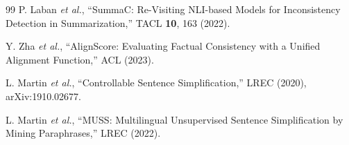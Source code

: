 \documentclass[aps,prb,reprint,nofootinbib,a4paper]{revtex4-2}
\begin{document}
\begin{thebibliography}{99}
 P. Laban \textit{et al.},
``SummaC: Re-Visiting NLI-based Models for Inconsistency Detection in
Summarization,'' TACL \textbf{10}, 163 (2022).

 Y. Zha \textit{et al.},
``AlignScore: Evaluating Factual Consistency with a Unified Alignment Function,''
ACL (2023).

 L. Martin \textit{et al.},
``Controllable Sentence Simplification,'' LREC (2020), arXiv:1910.02677.

 L. Martin \textit{et al.},
``MUSS: Multilingual Unsupervised Sentence Simplification by Mining
Paraphrases,'' LREC (2022).

\end{thebibliography}
\end{document}
